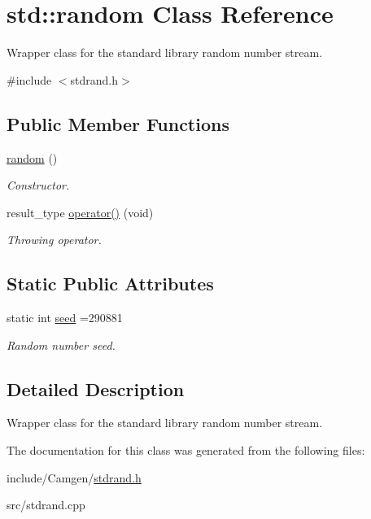\hypertarget{a00459}{\section{std\-:\-:random Class Reference}
\label{a00459}
}


Wrapper class for the standard library random number stream.  




{\ttfamily \#include $<$stdrand.\-h$>$}

\subsection*{Public Member Functions}
\begin{DoxyCompactItemize}
\item 
\hypertarget{a00459_a13ce6353ffa84582f89d240e2ce532ad}{\hyperlink{a00459_a13ce6353ffa84582f89d240e2ce532ad}{random} ()}\label{a00459_a13ce6353ffa84582f89d240e2ce532ad}

\begin{DoxyCompactList}\small\item\em Constructor. \end{DoxyCompactList}\item 
\hypertarget{a00459_a40a37402e206b13482dd88eb7573f4fc}{result\-\_\-type \hyperlink{a00459_a40a37402e206b13482dd88eb7573f4fc}{operator()} (void)}\label{a00459_a40a37402e206b13482dd88eb7573f4fc}

\begin{DoxyCompactList}\small\item\em Throwing operator. \end{DoxyCompactList}\end{DoxyCompactItemize}
\subsection*{Static Public Attributes}
\begin{DoxyCompactItemize}
\item 
\hypertarget{a00459_a96735d66e9304470438ffd5b0eb13c67}{static int \hyperlink{a00459_a96735d66e9304470438ffd5b0eb13c67}{seed} =290881}\label{a00459_a96735d66e9304470438ffd5b0eb13c67}

\begin{DoxyCompactList}\small\item\em Random number seed. \end{DoxyCompactList}\end{DoxyCompactItemize}


\subsection{Detailed Description}
Wrapper class for the standard library random number stream. 

The documentation for this class was generated from the following files\-:\begin{DoxyCompactItemize}
\item 
include/\-Camgen/\hyperlink{a00765}{stdrand.\-h}\item 
src/stdrand.\-cpp\end{DoxyCompactItemize}
